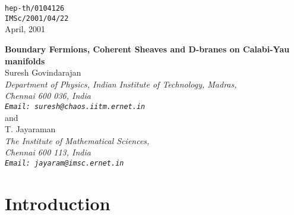 \documentclass[a4paper,12pt]{article}
\begin{document}
\begin{titlepage}
\begin{flushright}
{\tt hep-th/0104126}\\
{\tt IMSc/2001/04/22} \\
April, 2001
\end{flushright}
\begin{center}
{\Large \bf Boundary Fermions, Coherent Sheaves and D-branes on Calabi-Yau
manifolds} \\[1cm]
Suresh Govindarajan\\
{\em Department of Physics, Indian Institute of Technology, Madras,\\
Chennai 600 036, India\\
{\tt Email: suresh@chaos.iitm.ernet.in}\\[10pt]}
and \\[10pt]
T. Jayaraman\\
{\em The Institute of Mathematical Sciences, \\ Chennai 600 113, India\\
{\tt Email: jayaram@imsc.ernet.in}\\[10pt]}
\end{center}
\vfill
\begin{abstract}
We construct boundary conditions in the gauged linear sigma model for B-type
D-branes on Calabi-Yau manifolds that correspond to coherent sheaves 
given by the cohomology of a monad. This necessarily involves the
introduction of boundary fields, and in particular, boundary fermions.
The large-volume monodromy for these D-brane configurations
is implemented by the introduction of boundary contact terms. We also
discuss the construction of D-branes associated to coherent sheaves that
are the cohomology of complexes of arbitrary length.  
We illustrate the construction using examples, specifically those
associated with the large-volume analogues of the 
Recknagel-Schomerus states with no moduli. Using some of
these examples we also construct D-brane states that arise as bound
states of the above rigid configurations and show how moduli can be
counted in these cases. 
\end{abstract}
\vfill
\end{titlepage}

\section{Introduction}
 
\end{document}
